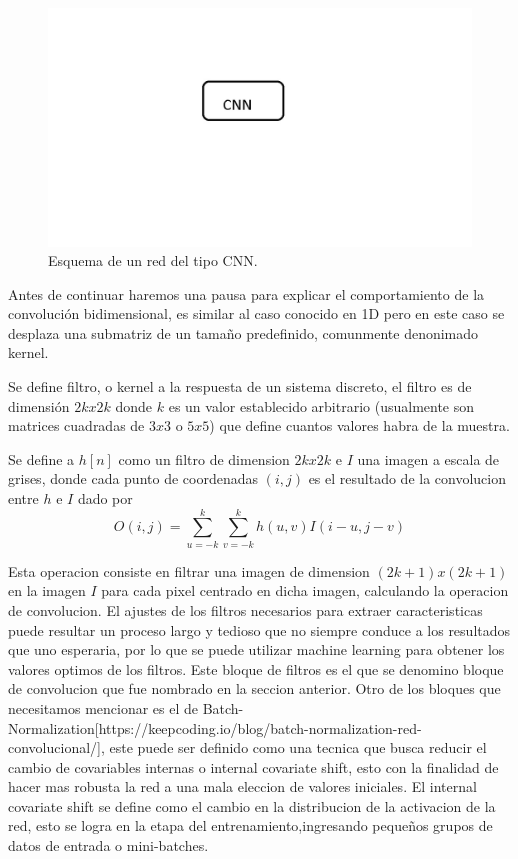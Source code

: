 \begin{figure}
    \centering
    \includegraphics[width=1\textwidth]{imgs/CNN-completa.jpg}
    \caption{Esquema de un red del tipo CNN.}
    \label{fig:esquema-CNN}
\end{figure}
Antes de continuar haremos una pausa para explicar el comportamiento de la convolución bidimensional, es similar al caso conocido en 1D pero
en este caso se desplaza una submatriz de un tamaño predefinido, comunmente denonimado kernel.

Se define filtro, o kernel a la respuesta de un sistema discreto, el filtro es de dimensión $2k x 2k$ donde $k$ es un
valor establecido arbitrario (usualmente son matrices cuadradas de $3x3$ o $5x5$) que define cuantos valores habra de la muestra.

Se define a $h[n]$ como un filtro de dimension $2k x 2k$ e $I$ una imagen a escala de grises, donde cada punto de coordenadas $(i,j)$ es el
resultado de la convolucion entre $h$ e $I$ dado por
\begin{equation}
    O(i,j)= \sum_{u=-k}^{k} \sum_{v=-k}^{k} h(u,v)I(i-u,j-v)
\end{equation}

Esta operacion consiste en filtrar una imagen de dimension $(2k+1)x(2k+1)$ en la imagen $I$ para cada pixel centrado en dicha imagen,
calculando la operacion de convolucion.
El ajustes de los filtros necesarios para extraer caracteristicas puede resultar un proceso largo y tedioso que no siempre conduce a los
resultados que uno esperaria, por lo que se puede utilizar machine learning para obtener los valores optimos de los filtros.
Este bloque de filtros es el que se denomino bloque de convolucion que fue nombrado en la seccion anterior.
Otro de los bloques que necesitamos mencionar es el de Batch-Normalization[https://keepcoding.io/blog/batch-normalization-red-convolucional/], 
este puede ser definido como una tecnica que busca reducir el cambio de covariables internas o internal covariate shift, esto con la finalidad 
de hacer mas robusta la red a una mala eleccion de valores iniciales. El internal covariate shift se define como el cambio en la distribucion de la activacion de la red, 
esto se logra en la etapa del entrenamiento,ingresando pequeños grupos de datos de entrada o mini-batches.

